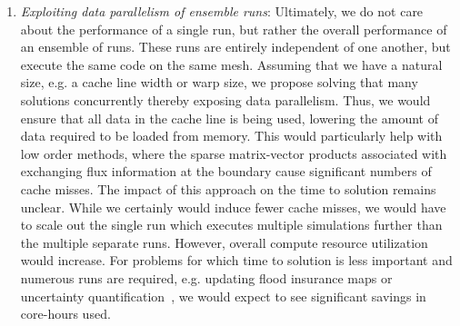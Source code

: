 \begin{enumerate}
\item {\em Exploiting data parallelism of ensemble runs}: Ultimately, we do not care about the performance of a single run, but rather the overall performance of an ensemble of runs. These runs are entirely independent of one another, but execute the same code on the same mesh. Assuming that we have a natural size, e.g. a cache line width or warp size, we propose solving that many solutions concurrently thereby exposing data parallelism. Thus, we would ensure that all data in the cache line is being used, lowering the amount of data required to be loaded from memory. This would particularly help with low order methods, where the sparse matrix-vector products associated with exchanging flux information at the boundary cause significant numbers of cache misses. The impact of this approach on the time to solution remains unclear. While we certainly would induce fewer cache misses, we would have to scale out the single run which executes multiple simulations further than the multiple separate runs.  However, overall compute resource utilization would increase. For problems for which time to solution is less important and numerous runs are required, e.g. updating flood insurance maps or uncertainty quantification~\cite{Graham2017}, we would expect to see significant savings in core-hours used.
\end{enumerate}



